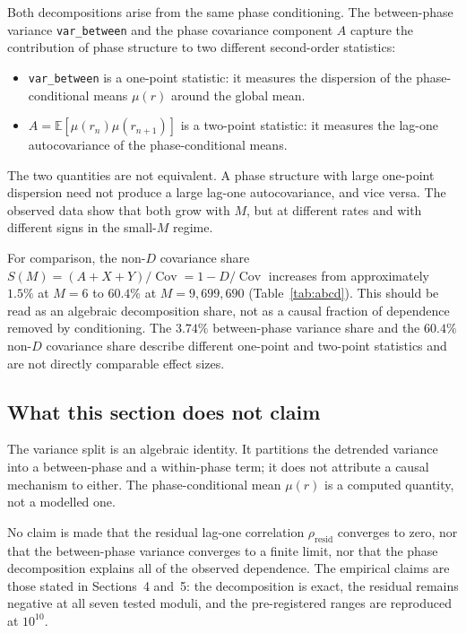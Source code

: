 Both decompositions arise from the same phase conditioning. The between-phase variance \texttt{var\_between} and the phase covariance component $A$ capture the contribution of phase structure to two different second-order statistics:

\begin{itemize}
\item \texttt{var\_between} is a one-point statistic: it measures the dispersion of the phase-conditional means $\mu(r)$ around the global mean.
\item $A = \mathbb{E}[\mu(r_n)\mu(r_{n+1})]$ is a two-point statistic: it measures the lag-one autocovariance of the phase-conditional means.
\end{itemize}

The two quantities are not equivalent. A phase structure with large one-point dispersion need not produce a large lag-one autocovariance, and vice versa. The observed data show that both grow with $M$, but at different rates and with different signs in the small-$M$ regime.

For comparison, the non-$D$ covariance share $S(M)=(A+X+Y)/\operatorname{Cov}=1-D/\operatorname{Cov}$ increases from approximately $1.5\%$ at $M=6$ to $60.4\%$ at $M=9{,}699{,}690$ (Table~\ref{tab:abcd}). This should be read as an algebraic decomposition share, not as a causal fraction of dependence removed by conditioning. The $3.74\%$ between-phase variance share and the $60.4\%$ non-$D$ covariance share describe different one-point and two-point statistics and are not directly comparable effect sizes.

\subsection{What this section does not claim}

The variance split is an algebraic identity. It partitions the detrended variance into a between-phase and a within-phase term; it does not attribute a causal mechanism to either. The phase-conditional mean $\mu(r)$ is a computed quantity, not a modelled one.

No claim is made that the residual lag-one correlation $\rho_{\text{resid}}$ converges to zero, nor that the between-phase variance converges to a finite limit, nor that the phase decomposition explains all of the observed dependence. The empirical claims are those stated in Sections~4 and~5: the decomposition is exact, the residual remains negative at all seven tested moduli, and the pre-registered ranges are reproduced at $10^{10}$.
